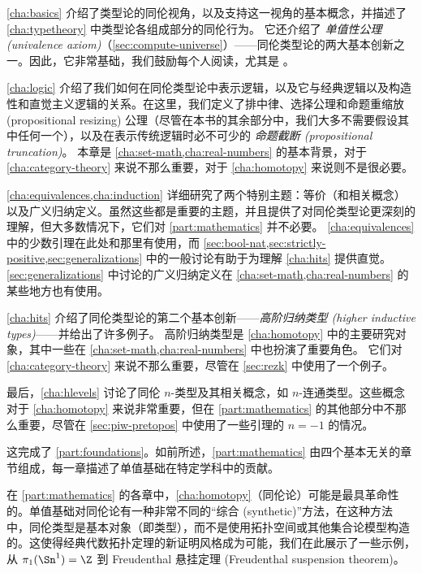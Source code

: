 \cref{cha:basics} 介绍了类型论的同伦视角，以及支持这一视角的基本概念，并描述了 \cref{cha:typetheory} 中类型论各组成部分的同伦行为。
它还介绍了 \emph{单值性公理 (univalence axiom)}（\cref{sec:compute-universe}）——同伦类型论的两大基本创新之一。因此，它非常基础，我们鼓励每个人阅读，尤其是 。

\cref{cha:logic} 介绍了我们如何在同伦类型论中表示逻辑，以及它与经典逻辑以及构造性和直觉主义逻辑的关系。在这里，我们定义了排中律、选择公理和命题重缩放 (propositional resizing) 公理（尽管在本书的其余部分中，我们大多不需要假设其中任何一个），以及在表示传统逻辑时必不可少的 \emph{命题截断 (propositional truncation)}。
本章是 \cref{cha:set-math,cha:real-numbers} 的基本背景，对于 \cref{cha:category-theory} 来说不那么重要，对于 \cref{cha:homotopy} 来说则不是很必要。

\cref{cha:equivalences,cha:induction} 详细研究了两个特别主题：等价（和相关概念）以及广义归纳定义。虽然这些都是重要的主题，并且提供了对同伦类型论更深刻的理解，但大多数情况下，它们对 \cref{part:mathematics} 并不必要。
\cref{cha:equivalences} 中的少数引理在此处和那里有使用，而 \cref{sec:bool-nat,sec:strictly-positive,sec:generalizations} 中的一般讨论有助于为理解 \cref{cha:hits} 提供直觉。
\cref{sec:generalizations} 中讨论的广义归纳定义在 \cref{cha:set-math,cha:real-numbers} 的某些地方也有使用。

\cref{cha:hits} 介绍了同伦类型论的第二个基本创新——\emph{高阶归纳类型 (higher inductive types)}——并给出了许多例子。
高阶归纳类型是 \cref{cha:homotopy} 中的主要研究对象，其中一些在 \cref{cha:set-math,cha:real-numbers} 中也扮演了重要角色。
它们对 \cref{cha:category-theory} 来说不那么重要，尽管在 \cref{sec:rezk} 中使用了一个例子。

最后，\cref{cha:hlevels} 讨论了同伦 $n$-类型及其相关概念，如 $n$-连通类型。这些概念对于 \cref{cha:homotopy} 来说非常重要，但在 \cref{part:mathematics} 的其他部分中不那么重要，尽管在 \cref{sec:piw-pretopos} 中使用了一些引理的 $n=-1$ 的情况。

这完成了 \cref{part:foundations}。如前所述，\cref{part:mathematics} 由四个基本无关的章节组成，每一章描述了单值基础在特定学科中的贡献。

在 \cref{part:mathematics} 的各章中，\cref{cha:homotopy}（同伦论）可能是最具革命性的。单值基础对同伦论有一种非常不同的“综合 (synthetic)”方法，在这种方法中，同伦类型是基本对象（即类型），而不是使用拓扑空间或其他集合论模型构造的。这使得经典代数拓扑定理的新证明风格成为可能，我们在此展示了一些示例，从 $\pi_1(\Sn^1)=\Z$ 到 Freudenthal 悬挂定理 (Freudenthal suspension theorem)。

